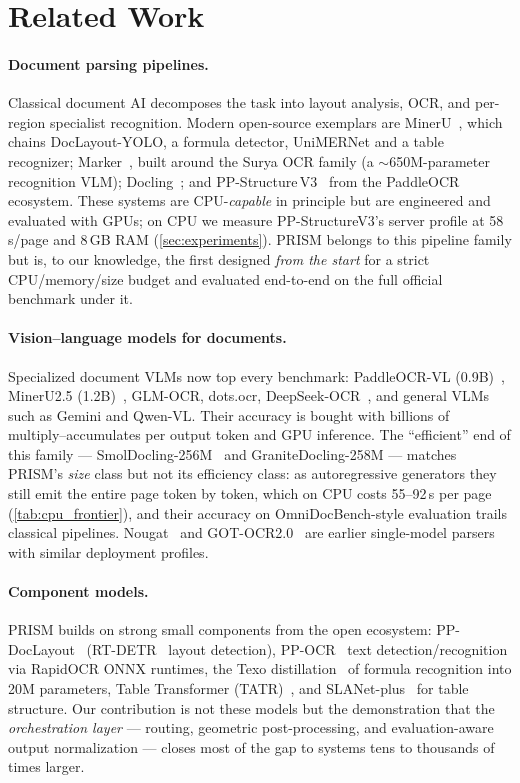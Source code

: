 \section{Related Work}
\label{sec:related}

\paragraph{Document parsing pipelines.}
Classical document AI decomposes the task into layout analysis, OCR, and per-region specialist recognition. Modern open-source exemplars are MinerU~\cite{mineru}, which chains DocLayout-YOLO, a formula detector, UniMERNet and a table recognizer; Marker~\cite{marker}, built around the Surya OCR family (a $\sim$650M-parameter recognition VLM); Docling~\cite{docling}; and PP-Structure\,V3~\cite{ppstructurev3} from the PaddleOCR ecosystem. These systems are CPU-\emph{capable} in principle but are engineered and evaluated with GPUs; on CPU we measure PP-StructureV3's server profile at 58\,s/page and 8\,GB RAM (\cref{sec:experiments}). PRISM belongs to this pipeline family but is, to our knowledge, the first designed \emph{from the start} for a strict CPU/memory/size budget and evaluated end-to-end on the full official benchmark under it.

\paragraph{Vision--language models for documents.}
Specialized document VLMs now top every benchmark: PaddleOCR-VL (0.9B)~\cite{paddleocrvl}, MinerU2.5 (1.2B)~\cite{mineru25}, GLM-OCR, dots.ocr, DeepSeek-OCR~\cite{deepseekocr}, and general VLMs such as Gemini and Qwen-VL. Their accuracy is bought with billions of multiply--accumulates per output token and GPU inference. The ``efficient'' end of this family --- SmolDocling-256M~\cite{smoldocling} and GraniteDocling-258M --- matches PRISM's \emph{size} class but not its efficiency class: as autoregressive generators they still emit the entire page token by token, which on CPU costs 55--92\,s per page (\cref{tab:cpu_frontier}), and their accuracy on OmniDocBench-style evaluation trails classical pipelines. Nougat~\cite{nougat} and GOT-OCR2.0~\cite{got} are earlier single-model parsers with similar deployment profiles.

\paragraph{Component models.}
PRISM builds on strong small components from the open ecosystem: PP-DocLayout~\cite{ppdoclayout} (RT-DETR~\cite{rtdetr} layout detection), PP-OCR~\cite{ppocr} text detection/recognition via RapidOCR ONNX runtimes, the Texo distillation~\cite{texo} of formula recognition into 20M parameters, Table Transformer (TATR)~\cite{tatr}, and SLANet-plus~\cite{slanet} for table structure. Our contribution is not these models but the demonstration that the \emph{orchestration layer} --- routing, geometric post-processing, and evaluation-aware output normalization --- closes most of the gap to systems tens to thousands of times larger.


